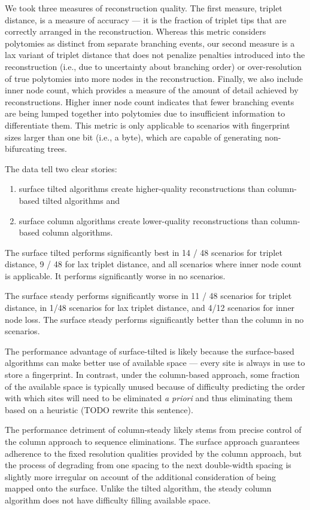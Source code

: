 We took three measures of reconstruction quality.
The first measure, triplet distance, is a measure of accuracy --- it is the fraction of triplet tips that are correctly arranged in the reconstruction.
Whereas this metric considers polytomies as distinct from separate branching events, our second measure is a lax variant of triplet distance that does not penalize penalties introduced into the reconstruction (i.e., due to uncertainty about branching order) or over-resolution of true polytomies into more nodes in the reconstruction.
Finally, we also include inner node count, which provides a measure of the amount of detail achieved by reconstructions.
Higher inner node count indicates that fewer branching events are being lumped together into polytomies due to insufficient information to differentiate them.
This metric is only applicable to scenarios with fingerprint sizes larger than one bit (i.e., a byte), which are capable of generating non-bifurcating trees.

The data tell two clear stories:
\begin{enumerate}
\item surface tilted algorithms create higher-quality reconstructions than column-based tilted algorithms and
\item surface column algorithms create lower-quality reconstructions than column-based column algorithms.
\end{enumerate}

The surface tilted performs significantly best in 14 / 48 scenarios for triplet distance, 9 / 48 for lax triplet distance, and all scenarios where inner node count is applicable.
It performs significantly worse in no scenarios.

The surface steady performs significantly worse in 11 / 48 scenarios for triplet distance, in 1/48 scenarios for lax triplet distance, and 4/12 scenarios for inner node loss.
The surface steady performs significantly better than the column in no scenarios.

The performance advantage of surface-tilted is likely because the surface-based algorithms can make better use of available space --- every site is always in use to store a fingerprint.
In contrast, under the column-based approach, some fraction of the available space is typically unused because of difficulty predicting the order with which sites will need to be eliminated \textit{a priori} and thus eliminating them based on a heuristic (TODO rewrite this sentence).

The performance detriment of column-steady likely stems from precise control of the column approach to sequence eliminations.
The surface approach guarantees adherence to the fixed resolution qualities provided by the column approach, but the process of degrading from one spacing to the next double-width spacing is slightly more irregular on account of the additional consideration of being mapped onto the surface.
Unlike the tilted algorithm, the steady column algorithm does not have difficulty filling available space.

